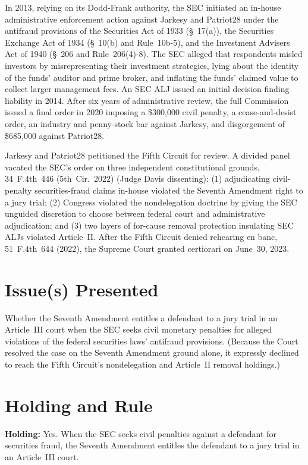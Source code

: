 \documentclass[12pt]{article}
\begin{document}
In 2013, relying on its Dodd-Frank authority, the SEC initiated an in-house administrative enforcement action against Jarkesy and Patriot28 under the antifraud provisions of the Securities Act of 1933 (\S~17(a)), the Securities Exchange Act of 1934 (\S~10(b) and Rule~10b-5), and the Investment Advisers Act of 1940 (\S~206 and Rule~206(4)-8). The SEC alleged that respondents misled investors by misrepresenting their investment strategies, lying about the identity of the funds' auditor and prime broker, and inflating the funds' claimed value to collect larger management fees. An SEC ALJ issued an initial decision finding liability in 2014. After six years of administrative review, the full Commission issued a final order in 2020 imposing a \$300,000 civil penalty, a cease-and-desist order, an industry and penny-stock bar against Jarkesy, and disgorgement of \$685,000 against Patriot28.

Jarkesy and Patriot28 petitioned the Fifth Circuit for review. A divided panel vacated the SEC's order on three independent constitutional grounds, 34~F.4th~446 (5th~Cir.~2022) (Judge Davis dissenting): (1) adjudicating civil-penalty securities-fraud claims in-house violated the Seventh Amendment right to a jury trial; (2) Congress violated the nondelegation doctrine by giving the SEC unguided discretion to choose between federal court and administrative adjudication; and (3) two layers of for-cause removal protection insulating SEC ALJs violated Article~II. After the Fifth Circuit denied rehearing en banc, 51~F.4th~644 (2022), the Supreme Court granted certiorari on June~30, 2023.

\section{Issue(s) Presented}
Whether the Seventh Amendment entitles a defendant to a jury trial in an Article~III court when the SEC seeks civil monetary penalties for alleged violations of the federal securities laws' antifraud provisions. (Because the Court resolved the case on the Seventh Amendment ground alone, it expressly declined to reach the Fifth Circuit's nondelegation and Article~II removal holdings.)

\section{Holding and Rule}
\textbf{Holding:} Yes. When the SEC seeks civil penalties against a defendant for securities fraud, the Seventh Amendment entitles the defendant to a jury trial in an Article~III court.
\end{document}
